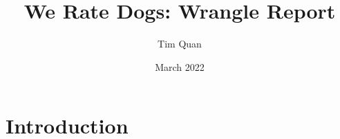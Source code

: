 \documentclass{report}
\title{We Rate Dogs: Wrangle Report}
\date{March 2022}
\author{Tim Quan}
\begin{document}
\maketitle
\section{Introduction}
\end{document}
